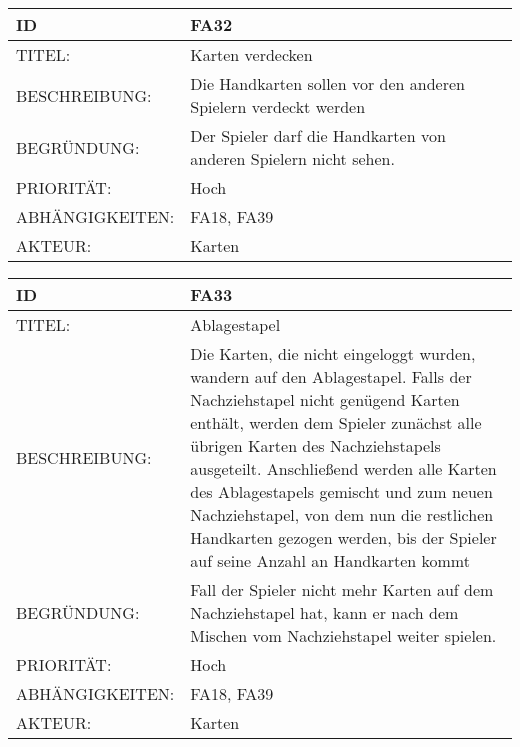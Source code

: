 \documentclass{uulm-assignment}
\begin{document}
    
    \begin{tabularx}{\textwidth}{|l|X |} \hline
        \textbf{ID} & \textbf{FA32} \\
        \hline
        TITEL: & Karten verdecken\\
        \hline
        BESCHREIBUNG: & Die Handkarten sollen vor den anderen Spielern verdeckt werden 
        \\
        \hline
        BEGRÜNDUNG: & Der Spieler darf die Handkarten von anderen Spielern nicht sehen.\\
        \hline
        PRIORITÄT: & Hoch\\
        \hline
        ABHÄNGIGKEITEN: & FA18, FA39 \\
        \hline
        AKTEUR: & Karten\\
        \hline
    \end{tabularx}
    

    
    \begin{tabularx}{\textwidth}{|l|X |} \hline
        \textbf{ID} & \textbf{FA33} \\
        \hline
        TITEL: & Ablagestapel\\
        \hline
        BESCHREIBUNG: & Die Karten, die nicht eingeloggt wurden, wandern auf den Ablagestapel.  Falls der Nachziehstapel nicht genügend Karten enthält, werden dem
Spieler zunächst alle übrigen Karten des Nachziehstapels ausgeteilt. Anschließend werden alle Karten
des Ablagestapels gemischt und zum neuen Nachziehstapel, von dem nun die restlichen Handkarten
gezogen werden, bis der Spieler auf seine Anzahl an Handkarten kommt
        \\
        \hline
        BEGRÜNDUNG: & Fall der Spieler nicht mehr Karten auf dem Nachziehstapel hat, kann er nach dem Mischen vom Nachziehstapel weiter spielen.\\
        \hline
        PRIORITÄT: & Hoch\\
        \hline
        ABHÄNGIGKEITEN: & FA18, FA39\\
        \hline
        AKTEUR: & Karten\\
        \hline
    \end{tabularx}
    
\end{document}
